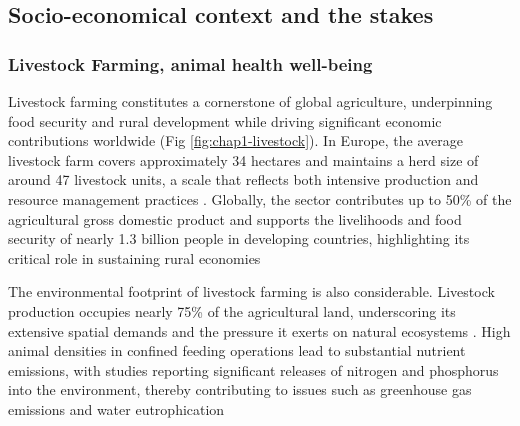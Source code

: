 \subsection{Socio-economical context and the stakes}




\subsubsection{Livestock Farming, animal health well-being}

Livestock farming constitutes a cornerstone of global agriculture, underpinning food security and rural development while driving significant economic contributions worldwide (Fig \ref{fig:chap1-livestock}). In Europe, the average livestock farm covers approximately 34 hectares and maintains a herd size of around 47 livestock units, a scale that reflects both intensive production and resource management practices \cite{INRA_Livestock_Production}. Globally, the sector contributes up to 50\% of the agricultural gross domestic product and supports the livelihoods and food security of nearly 1.3 billion people in developing countries, highlighting its critical role in sustaining rural economies \cite{Herrero2016, FAO2017}

The environmental footprint of livestock farming is also considerable. Livestock production occupies nearly 75\% of the agricultural land, underscoring its extensive spatial demands and the pressure it exerts on natural ecosystems \cite{Steinfeld181371}. High animal densities in confined feeding operations lead to substantial nutrient emissions, with studies reporting significant releases of nitrogen and phosphorus into the environment, thereby contributing to issues such as greenhouse gas emissions and water eutrophication \cite{Ramankutty2018, Mallin2015, LI2016451}


